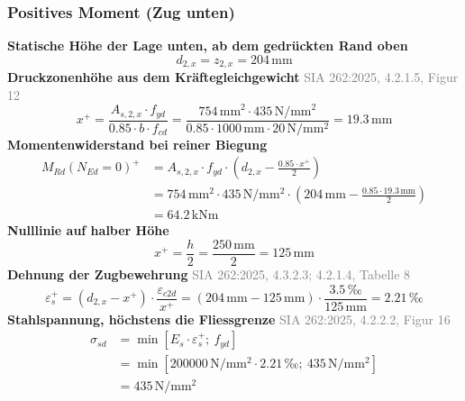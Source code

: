\documentclass[11pt,a4paper]{article}
\newcommand{\normref}[1]{{\small\textcolor{gray}{#1}}}
\begin{document}
\subsubsection{Positives Moment (Zug unten)}
\noindent\textbf{Statische Höhe der Lage unten, ab dem gedrückten Rand oben}
\begin{equation*}
d_{2,x} = z_{2,x} = 204\,\mathrm{mm}
\end{equation*}
\noindent\textbf{Druckzonenhöhe aus dem Kräftegleichgewicht} \hfill \normref{SIA 262:2025, 4.2.1.5, Figur 12}
\begin{equation*}
x^{+} = \frac{A_{s,2,x} \cdot f_{yd}}{0.85 \cdot b \cdot f_{cd}} = \frac{754\,\mathrm{mm}^{2} \cdot 435\,\mathrm{N}/\mathrm{mm}^{2}}{0.85 \cdot 1000\,\mathrm{mm} \cdot 20\,\mathrm{N}/\mathrm{mm}^{2}} = 19.3\,\mathrm{mm}
\end{equation*}
\noindent\textbf{Momentenwiderstand bei reiner Biegung}
\begin{equation*}
\begin{aligned}
  M_{Rd}(N_{Ed}=0)^{+} &= A_{s,2,x} \cdot f_{yd} \cdot \left(d_{2,x} - \frac{0.85 \cdot x^{+}}{2}\right) \\
  &= 754\,\mathrm{mm}^{2} \cdot 435\,\mathrm{N}/\mathrm{mm}^{2} \cdot \left(204\,\mathrm{mm} - \frac{0.85 \cdot 19.3\,\mathrm{mm}}{2}\right) \\
  &= 64.2\,\mathrm{kNm}
\end{aligned}
\end{equation*}
\noindent\textbf{Nulllinie auf halber Höhe}
\begin{equation*}
x^{+} = \frac{h}{2} = \frac{250\,\mathrm{mm}}{2} = 125\,\mathrm{mm}
\end{equation*}
\noindent\textbf{Dehnung der Zugbewehrung} \hfill \normref{SIA 262:2025, 4.3.2.3; 4.2.1.4, Tabelle 8}
\begin{equation*}
\varepsilon_s^{+} = \left(d_{2,x} - x^{+}\right) \cdot \frac{\varepsilon_{c2d}}{x^{+}} = \left(204\,\mathrm{mm} - 125\,\mathrm{mm}\right) \cdot \frac{3.5\,\text{‰}}{125\,\mathrm{mm}} = 2.21\,\text{‰}
\end{equation*}
\noindent\textbf{Stahlspannung, höchstens die Fliessgrenze} \hfill \normref{SIA 262:2025, 4.2.2.2, Figur 16}
\begin{equation*}
\begin{aligned}
  \sigma_{sd} &= \min\left[E_s \cdot \varepsilon_s^{+};\ f_{yd}\right] \\
  &= \min\left[200000\,\mathrm{N}/\mathrm{mm}^{2} \cdot 2.21\,\text{‰};\ 435\,\mathrm{N}/\mathrm{mm}^{2}\right] \\
  &= 435\,\mathrm{N}/\mathrm{mm}^{2}
\end{aligned}
\end{equation*}
\end{document}
